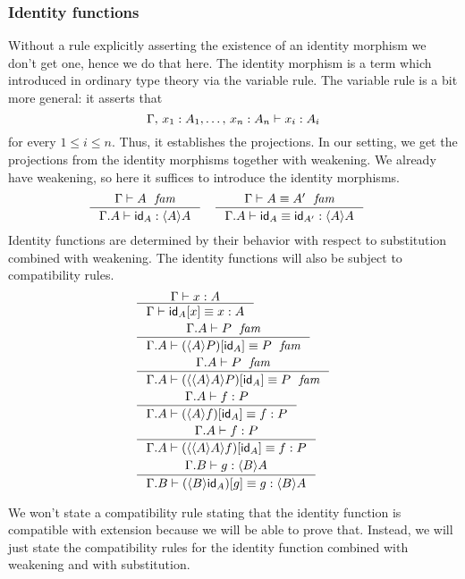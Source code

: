\subsubsection{Identity functions}
Without a rule explicitly asserting the existence of an identity morphism we don't
get one, hence we do that here. The identity morphism is a term which introduced
in ordinary type theory via the variable rule. The variable rule is a bit more
general: it asserts that
\begin{equation*}
\jterm{\Gamma,\,x_1:A_1,\ldots,\,x_n:A_n}{A_i}{x_i}
\end{equation*}
for every $1\leq i\leq n$. Thus, it establishes the projections. In our setting,
we get the projections from the identity morphisms together with weakening. We
already have weakening, so here it suffices to introduce the identity morphisms.
\begin{align}
& \inference
  {\jfam{\Gamma}{A}}
  {\jterm{{\Gamma}{A}}{\ctxwk{A}{A}}{\idfunc[A]}}
& & \inference
    {\jfameq{\Gamma}{A}{A'}}
    {\jtermeq{{\Gamma}{A}}{\ctxwk{A}{A}}{\idfunc[A]}{\idfunc[A']}}
\end{align}
Identity functions are determined by their behavior with respect to substitution combined with
weakening. The identity functions will also be subject to compatibility rules.
\begin{align}
& \inference
  {\jterm{\Gamma}{A}{x}}
  {\jtermeq{\Gamma}{A}{\subst{x}{\idfunc[A]}}{x}}
  \label{idfunc-subst-defn}\\
& \inference
  {\jfam{{\Gamma}{A}}{P}}
  {\jfameq{{\Gamma}{A}}{\subst{\idfunc[A]}{\ctxwk{A}{P}}}{P}}
  \label{idfunc-wk-defn}\\
& \inference
  {\jfam{{\Gamma}{A}}{P}}
  {\jfameq{{\Gamma}{A}}{\subst{\idfunc[A]}{\ctxwk{{A}{A}}{P}}}{P}}
  \label{idfunc-wk-defn2}\\
& \inference
  {\jterm{{\Gamma}{A}}{P}{f}}
  {\jtermeq{{\Gamma}{A}}{P}{\subst{\idfunc[A]}{\ctxwk{A}{f}}}{f}}
  \label{idfunc-precomp}\\
& \inference
  {\jterm{{\Gamma}{A}}{P}{f}}
  {\jtermeq{{\Gamma}{A}}{P}{\subst{\idfunc[A]}{\ctxwk{{A}{A}}{f}}}{f}}
  \label{idfunc-precomp}\\
& \inference
  {\jterm{{\Gamma}{B}}{\ctxwk{B}{A}}{g}}
  {\jtermeq{{\Gamma}{B}}{\ctxwk{B}{A}}{\subst{g}{\ctxwk{B}{\idfunc[A]}}}{g}}
  \label{idfunc-postcomp}
\end{align}

We won't state a compatibility rule stating that the identity function is
compatible with extension because we will be able to prove that. Instead, we
will just state the compatibility rules for the identity function combined with
weakening and with substitution.

